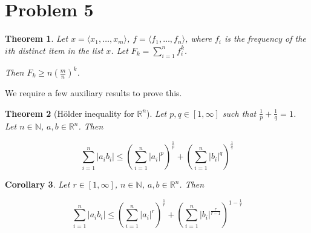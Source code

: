 \documentclass[11pt]{amsart}
\newtheorem{theorem}{Theorem}[section]
\newtheorem{corollary}[theorem]{Corollary}
\begin{document}
\section*{Problem 5}
\addtocounter{section}{1}
\setcounter{theorem}{0}

\begin{theorem}Let $x = \langle x_1, \dots, x_m \rangle$, $f = \langle f_1, \dots, f_n \rangle$, where $f_i$ is the frequency of the $i$th distinct item in the list $x$. Let $F_k = \sum_{i=1}^n f_i^k$.

Then $F_k \ge n \left(\frac{m}{n}\right)^k$.
\end{theorem}

We require a few auxiliary results to prove this.

\begin{theorem}[Hölder inequality for $\mathbb{R}^n$] Let $p, q \in [1, \infty]$ such that $\frac{1}{p} + \frac{1}{q} = 1$. Let $n \in \mathbb{N}$, $a, b \in \mathbb{R}^n$. Then

$$
\sum_{i=1}^n |a_i b_i| \le \left(\sum_{i=1}^n |a_i|^p\right)^{\frac{1}{p}} + \left(\sum_{i=1}^n |b_i|^q\right)^{\frac{1}{q}}
$$
\end{theorem}

\begin{corollary}\label{cor1}
Let $r \in [1, \infty]$, $n \in \mathbb{N}$, $a, b \in \mathbb{R}^n$. Then

$$
\sum_{i=1}^n |a_i b_i| \le \left(\sum_{i=1}^n |a_i|^r\right)^{\frac{1}{r}} + \left(\sum_{i=1}^n |b_i|^{\frac{r}{r-1}}\right)^{1 - \frac{1}{r}}
$$
\end{corollary}
\end{document}

